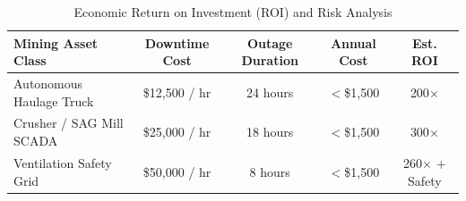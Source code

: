\documentclass[conference]{IEEEtran}
\begin{document}
\begin{table}[htbp]
\caption{Economic Return on Investment (ROI) and Risk Analysis}
\label{tab:economic}
\centering
\begin{tabularx}{\columnwidth}{lcccc}
\toprule
\textbf{Mining Asset Class} & \textbf{Downtime Cost} & \textbf{Outage Duration} & \textbf{Annual Cost} & \textbf{Est. ROI} \\
\midrule
Autonomous Haulage Truck & \$12,500 / hr & 24 hours & $<$\$1,500 & 200$\times$ \\
Crusher / SAG Mill SCADA & \$25,000 / hr & 18 hours & $<$\$1,500 & 300$\times$ \\
Ventilation Safety Grid & \$50,000 / hr & 8 hours & $<$\$1,500 & 260$\times$ + Safety \\
\bottomrule
\end{tabularx}
\end{table}
\end{document}
